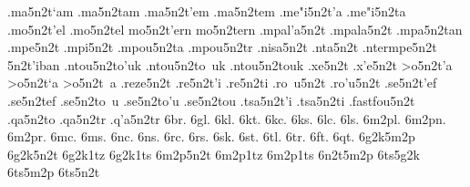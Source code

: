 {.ma5n2t`am
.ma5n2tam
.ma5n2t'em   %
.ma5n2tem
.me"i5n2t'a  %
.me"i5n2ta
.mo5n2t'el   %
.mo5n2tel
mo5n2t'ern   %
mo5n2tern
.mpal'a5n2t  %
.mpala5n2t
.mpa5n2tan   %
.mpe5n2t     %
.mpi5n2t     %
.mpou5n2ta   %
.mpou5n2tr   %
.nisa5n2t    %
.nta5n2t     %
.ntermpe5n2t %
5n2t'iban    %
.ntou5n2to'uk %
.ntou5n2to~uk
.ntou5n2touk
.xe5n2t      %
.x'e5n2t
>o5n2t'a     %
>o5n2t`a
>o5n2t~a
.reze5n2t    %
.re5n2t'i    %
.re5n2ti 
.ro~u5n2t    %
.ro'u5n2t
.se5n2t'ef   %
.se5n2tef
.se5n2to~u   %
.se5n2to'u
.se5n2tou
.tsa5n2t'i   %
.tsa5n2ti
.fastfou5n2t %
.qa5n2to     %
.qa5n2tr     %
.q'a5n2tr
6br.   %
6gl.   %
6kl.   %
6kt.   %
6kc.   %
6ks.
6lc.   %
6ls.
6m2pl. %
6m2pn. %
6m2pr. %
6mc.   %
6ms.
6nc.   %
6ns.
6rc.   %
6rs.
6sk.   %
6st.   %
6tl.   %
6tr.   %
6ft.   %
6qt.   %
6g2k5m2p
6g2k5n2t
6g2k1tz
6g2k1ts
6m2p5n2t
6m2p1tz
6m2p1ts
6n2t5m2p
6ts5g2k
6ts5m2p
6ts5n2t
} %
\endgroup
\endinput
